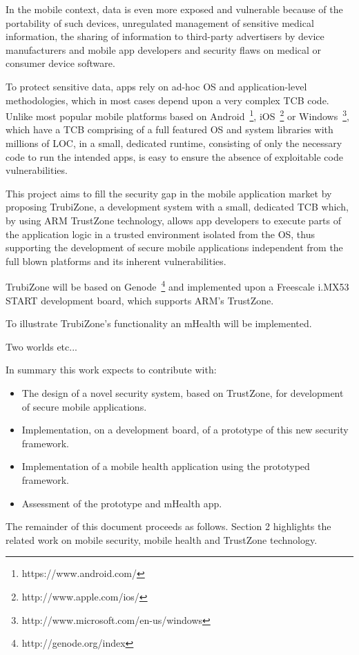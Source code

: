In the mobile context, data is even more exposed and vulnerable because of the portability of such devices, unregulated management of sensitive medical information, the sharing of information to third-party advertisers by device manufacturers and mobile app developers and security flaws on medical or consumer device software.

To protect sensitive data, \ac{apps} rely on ad-hoc \ac{OS} and application-level methodologies, which in most cases depend upon a very complex \ac{TCB} code. Unlike most popular mobile platforms based on Android~\footnote{https://www.android.com/}, iOS~\footnote{http://www.apple.com/ios/} or Windows~\footnote{http://www.microsoft.com/en-us/windows}, which have a \ac{TCB} comprising of a full featured \ac{OS} and system libraries with millions of \ac{LOC}, in a small, dedicated runtime, consisting of only the necessary code to run the intended \ac{apps}, is easy to ensure the absence of exploitable code vulnerabilities.

This project aims to fill the security gap in the mobile application market by proposing TrubiZone, a development system with a small, dedicated \ac{TCB} which, by using ARM TrustZone technology, allows app developers to execute parts of the application logic in a trusted environment isolated from the \ac{OS}, thus supporting the development of secure mobile applications independent from the full blown platforms and its inherent vulnerabilities.

TrubiZone will be based on Genode~\footnote{http://genode.org/index} and implemented upon a Freescale i.MX53 START development board, which supports ARM's TrustZone.


To illustrate TrubiZone's functionality an \ac{mHealth} will be implemented.


Two worlds etc...

In summary this work expects to contribute with:
\begin{itemize}
	\item The design of a novel security system, based on TrustZone, for development of secure mobile applications.
	\item Implementation, on a development board, of a prototype of this new security framework.
	\item Implementation of a mobile health application using the prototyped framework.
	\item Assessment of the prototype and \ac{mHealth} app.
\end{itemize}

The remainder of this document proceeds as follows. Section 2 highlights the related work on mobile security, mobile health and TrustZone technology.
